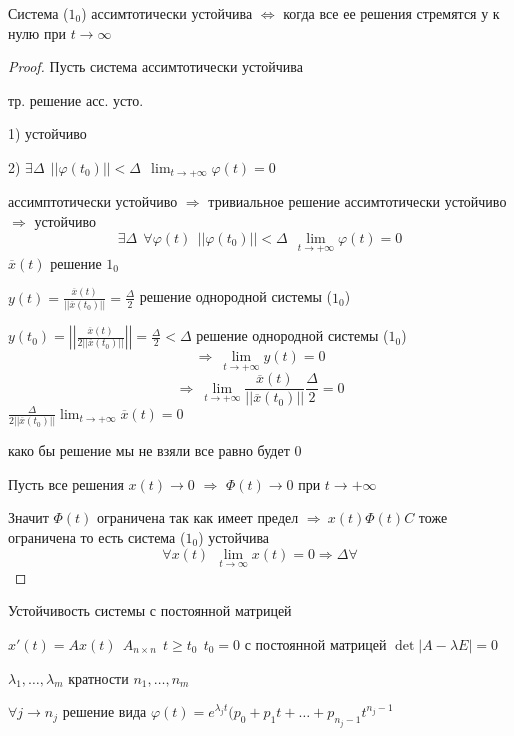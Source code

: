 \begin{block}[Утверждение]
  Система ($1_0$) ассимтотически устойчива $\Leftrightarrow$ когда все ее
  решения стремятся у к нулю при $t \to \infty$
\end{block}

\begin{proof}
  Пусть система ассимтотически устойчива

  тр. решение асс. усто.

  1) устойчиво

  2) $\exists \Delta ~~ ||\varphi(t_0)|| < \Delta ~~ \lim_{t \to +\infty}
  \varphi(t) = 0$

  ассимптотически устойчиво $\Rightarrow$ тривиальное решение ассимтотически
  устойчиво $\Rightarrow$ устойчиво
  $$
  \exists \Delta ~~ \forall \varphi(t) ~~ ||\varphi(t_0)|| < \Delta ~~
  \lim_{t \to +\infty} \varphi(t) = 0
  $$
  $\overline{x}(t)$ решение $1_0$

  $y(t) = \frac{\overline{x}(t)}{||\overline{x}(t_0)||} = \frac{\Delta}{2}$
  решение однородной системы ($1_0$)

  $y(t_0) = \left|\left|\frac{\overline{x}(t)}{2||\overline{x}(t_0)||}\right|
  \right| = \frac{\Delta}{2} < \Delta$
  решение однородной системы ($1_0$)
  $$
  \Rightarrow ~ \lim_{t \to +\infty}y(t) = 0
  $$
  $$
  \Rightarrow ~ \lim_{t \to +\infty} \frac{\overline{x}(t)}{
  ||\overline{x}(t_0)||} \frac{\Delta}{2} = 0
  $$
  $\frac{\Delta}{2||\overline{x}(t_0)||} \lim_{t \to +\infty} \overline{x}(t)
  = 0$

  како бы решение мы не взяли все равно будет $0$

  Пусть все решения $x(t) \to 0$ $\Rightarrow$ $\Phi(t) \to 0$ при $t \to
  +\infty$

  Значит $\Phi(t)$ ограничена так как имеет предел $\Rightarrow ~ x(t)\Phi(t)C$
  тоже ограничена то есть система ($1_0$) устойчива
  $$
  \forall x(t) ~~ \lim_{t \to \infty} x(t) = 0 \Rightarrow \Delta \forall
  $$
\end{proof}

\begin{title}[\Large]
  Устойчивость системы с постоянной матрицей
\end{title}

$x'(t) = Ax(t) ~~ A_{n \times n} ~~ t \ge t_0 ~~ t_0 = 0$ с постоянной матрицей
$\det|A - \lambda E| = 0$

$\lambda_1, \ldots, \lambda_m$ кратности $n_1, \ldots, n_m$

$\forall j \to n_j$ решение вида $\varphi(t) = e^{\lambda_j t}(p_0 + p_1 t +
\ldots + p_{n_j - 1} t^{n_j-1}$

